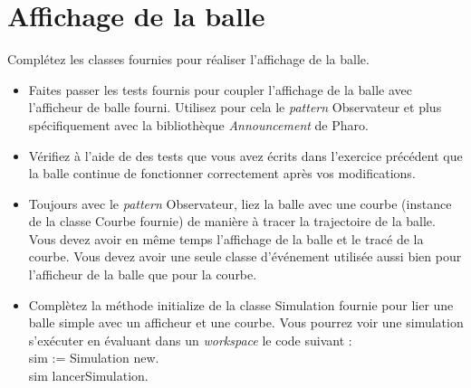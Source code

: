 \documentclass[12pt]{article}
\begin{document}
\section{Affichage de la balle}
Complétez les classes fournies pour réaliser l'affichage de la balle.
\begin{itemize}

	\item Faites passer les tests fournis pour coupler l'affichage de la balle avec l'afficheur de balle fourni.
	Utilisez pour cela le \emph{pattern} Observateur et plus spécifiquement avec la bibliothèque \emph{Announcement} de Pharo.

	\item Vérifiez à l'aide de des tests que vous avez écrits dans l'exercice précédent que la balle continue de fonctionner correctement après vos modifications.


	\item Toujours avec le \emph{pattern} Observateur, liez la balle avec une courbe (instance de la classe {\sf Courbe} fournie) de manière à tracer la trajectoire de la balle. Vous devez avoir en même temps l'affichage de la balle et le tracé de la courbe.
	Vous devez avoir une seule classe d'événement utilisée aussi bien pour l'afficheur de la balle que pour la courbe.

	\item Complètez la méthode {\sf initialize} de la classe {\sf Simulation} fournie pour lier une balle simple avec un afficheur et une courbe. Vous pourrez voir une simulation s'exécuter en évaluant dans un \emph{workspace} le code suivant :
	{\sf \\sim := Simulation new.
		\\sim lancerSimulation.
	}
\end{itemize}

%
\end{document}
